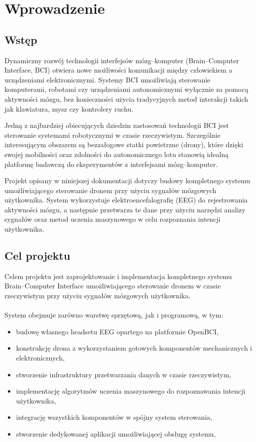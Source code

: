 \newpage
\section{Wprowadzenie}		
\subsection{Wstęp}
Dynamiczny rozwój technologii interfejsów mózg–komputer (Brain–Computer Interface, BCI) otwiera nowe możliwości komunikacji między człowiekiem a urządzeniami elektronicznymi. Systemy BCI umożliwiają sterowanie komputerami, robotami czy urządzeniami autonomicznymi wyłącznie za pomocą aktywności mózgu, bez konieczności użycia tradycyjnych metod interakcji takich jak klawiatura, mysz czy kontrolery ruchu.

\noindent Jedną z najbardziej obiecujących dziedzin zastosowań technologii BCI jest sterowanie systemami robotycznymi w czasie rzeczywistym. Szczególnie interesującym obszarem są bezzałogowe statki powietrzne (drony), które dzięki swojej mobilności oraz zdolności do autonomicznego lotu stanowią idealną platformę badawczą do eksperymentów z interfejsami mózg–komputer.

\noindent Projekt opisany w niniejszej dokumentacji dotyczy budowy kompletnego systemu umożliwiającego sterowanie dronem przy użyciu sygnałów mózgowych użytkownika. System wykorzystuje elektroencefalografię (EEG) do rejestrowania aktywności mózgu, a następnie przetwarza te dane przy użyciu narzędzi analizy sygnałów oraz metod uczenia maszynowego w celu rozpoznania intencji użytkownika.

\subsection{Cel projektu}
Celem projektu jest zaprojektowanie i implementacja kompletnego systemu \\ Brain–Computer Interface umożliwiającego sterowanie dronem w czasie rzeczywistym przy użyciu sygnałów mózgowych użytkownika.
\\ \\
System obejmuje zarówno warstwę sprzętową, jak i programową, w tym:
\begin{itemize}
    \item budowę własnego headsetu EEG opartego na platformie OpenBCI,
    \item konstrukcję drona z wykorzystaniem gotowych komponentów mechanicznych i elektronicznych,
    \item stworzenie infrastruktury przetwarzania danych w czasie rzeczywistym,
    \item implementację algorytmów uczenia maszynowego do rozpoznawania intencji użytkownika,
    \item integrację wszystkich komponentów w spójny system sterowania,
    \item stworzenie dedykowanej aplikacji umożliwiającej obsługę systemu,
\end{itemize}
